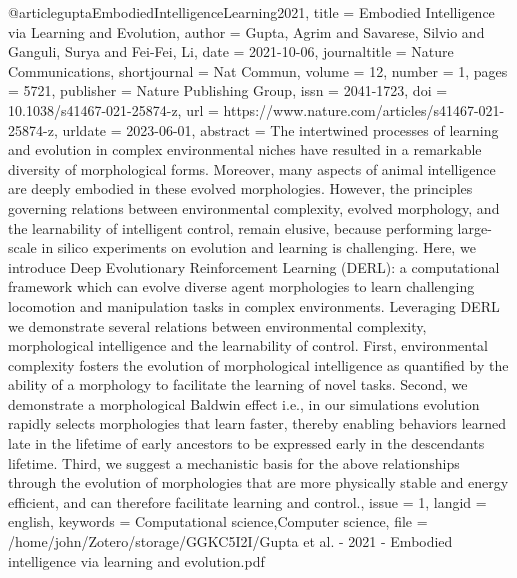 \begin{thebibliography}
@article{guptaEmbodiedIntelligenceLearning2021,
  title = {Embodied Intelligence via Learning and Evolution},
  author = {Gupta, Agrim and Savarese, Silvio and Ganguli, Surya and Fei-Fei, Li},
  date = {2021-10-06},
  journaltitle = {Nature Communications},
  shortjournal = {Nat Commun},
  volume = {12},
  number = {1},
  pages = {5721},
  publisher = {{Nature Publishing Group}},
  issn = {2041-1723},
  doi = {10.1038/s41467-021-25874-z},
  url = {https://www.nature.com/articles/s41467-021-25874-z},
  urldate = {2023-06-01},
  abstract = {The intertwined processes of learning and evolution in complex environmental niches have resulted in a remarkable diversity of morphological forms. Moreover, many aspects of animal intelligence are deeply embodied in these evolved morphologies. However, the principles governing relations between environmental complexity, evolved morphology, and the learnability of intelligent control, remain elusive, because performing large-scale in silico experiments on evolution and learning is challenging. Here, we introduce Deep Evolutionary Reinforcement Learning (DERL): a computational framework which can evolve diverse agent morphologies to learn challenging locomotion and manipulation tasks in complex environments. Leveraging DERL we demonstrate several relations between environmental complexity, morphological intelligence and the learnability of control. First, environmental complexity fosters the evolution of morphological intelligence as quantified by the ability of a morphology to facilitate the learning of novel tasks. Second, we demonstrate a morphological Baldwin effect i.e., in our simulations evolution rapidly selects morphologies that learn faster, thereby enabling behaviors learned late in the lifetime of early ancestors to be expressed early in the descendants lifetime. Third, we suggest a mechanistic basis for the above relationships through the evolution of morphologies that are more physically stable and energy efficient, and can therefore facilitate learning and control.},
  issue = {1},
  langid = {english},
  keywords = {Computational science,Computer science},
  file = {/home/john/Zotero/storage/GGKC5I2I/Gupta et al. - 2021 - Embodied intelligence via learning and evolution.pdf}
}


\end{thebibliography}
